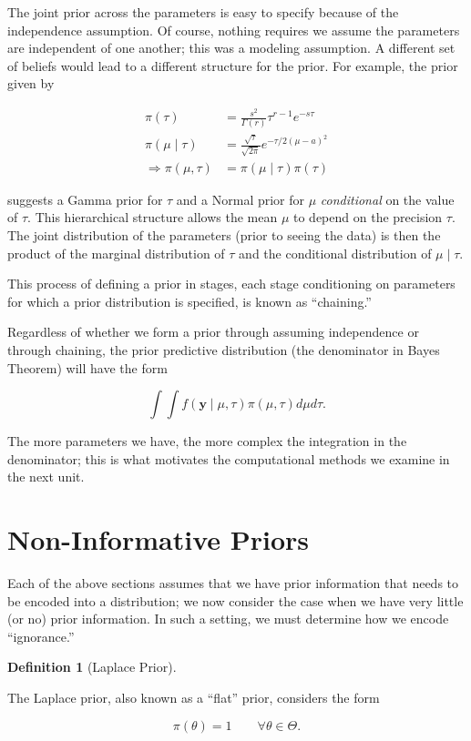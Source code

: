 \documentclass[
  letterpaper,
  DIV=11,
  numbers=noendperiod]{scrreprt}
\theoremstyle{definition}
\newtheorem{definition}{Definition}[chapter]
\theoremstyle{plain}
\theoremstyle{definition}
\theoremstyle{remark}
\begin{document}
The joint prior across the parameters is easy to specify because of the
independence assumption. Of course, nothing requires we assume the
parameters are independent of one another; this was a modeling
assumption. A different set of beliefs would lead to a different
structure for the prior. For example, the prior given by

\[
\begin{aligned}
  \pi(\tau) &= \frac{s^2}{\Gamma(r)} \tau^{r - 1} e^{-s\tau} \\
  \pi(\mu \mid \tau) &= \frac{\sqrt{\tau}}{\sqrt{2\pi}} e^{-\tau/2 (\mu - a)^2} \\
  \Rightarrow \pi(\mu, \tau) &= \pi(\mu \mid \tau) \pi(\tau)
\end{aligned}
\]

suggests a Gamma prior for \(\tau\) and a Normal prior for \(\mu\)
\emph{conditional} on the value of \(\tau\). This hierarchical structure
allows the mean \(\mu\) to depend on the precision \(\tau\). The joint
distribution of the parameters (prior to seeing the data) is then the
product of the marginal distribution of \(\tau\) and the conditional
distribution of \(\mu \mid \tau\).

This process of defining a prior in stages, each stage conditioning on
parameters for which a prior distribution is specified, is known as
``chaining.''

Regardless of whether we form a prior through assuming independence or
through chaining, the prior predictive distribution (the denominator in
Bayes Theorem) will have the form

\[\int \int f(\mathbf{y} \mid \mu, \tau) \pi(\mu, \tau) d\mu d\tau.\]

The more parameters we have, the more complex the integration in the
denominator; this is what motivates the computational methods we examine
in the next unit.

\hypertarget{non-informative-priors}{%
\section{Non-Informative Priors}\label{non-informative-priors}}

Each of the above sections assumes that we have prior information that
needs to be encoded into a distribution; we now consider the case when
we have very little (or no) prior information. In such a setting, we
must determine how we encode ``ignorance.''

\begin{definition}[Laplace
Prior]\protect\hypertarget{def-laplace-prior}{}\label{def-laplace-prior}

The Laplace prior, also known as a ``flat'' prior, considers the form

\[\pi(\theta) = 1 \qquad \forall \theta \in \Theta.\]

\end{definition}
\end{document}
